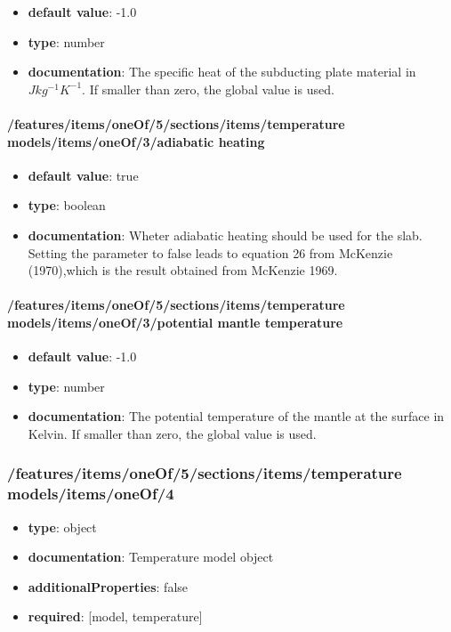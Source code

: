 \begin{itemize}\item {\bf default value}: -1.0
\item {\bf type}: number
\item {\bf documentation}: The specific heat of the subducting plate material in $J kg^{-1} K^{-1}$. If smaller than zero, the global value is used.
\end{itemize}\paragraph{/features/items/oneOf/5/sections/items/temperature models/items/oneOf/3/adiabatic heating}
\begin{itemize}\item {\bf default value}: true
\item {\bf type}: boolean
\item {\bf documentation}: Wheter adiabatic heating should be used for the slab. Setting the parameter to false leads to equation 26 from McKenzie (1970),which is the result obtained from McKenzie 1969.
\end{itemize}\paragraph{/features/items/oneOf/5/sections/items/temperature models/items/oneOf/3/potential mantle temperature}
\begin{itemize}\item {\bf default value}: -1.0
\item {\bf type}: number
\item {\bf documentation}: The potential temperature of the mantle at the surface in Kelvin. If smaller than zero, the global value is used.
\end{itemize}\subsubsection{/features/items/oneOf/5/sections/items/temperature models/items/oneOf/4}
\begin{itemize}\item {\bf type}: object
\item {\bf documentation}: Temperature model object
\item {\bf additionalProperties}: false
\item {\bf required}: [model, temperature]\end{itemize}
